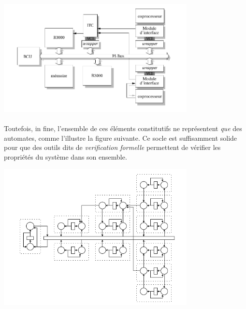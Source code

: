 \begin{center}
\begin{minipage}[t]{10cm}
 \centering
 \includegraphics[width=10cm]{./figures/system_1.png}
 \label{sys1}
\end{minipage}
\end{center}

\paragraph{} Toutefois, in fine, l'ensemble de ces éléments constitutifs ne représentent {\it que} des automates, comme l'illustre la figure suivante.
Ce socle est suffisamment solide pour que des outils dits de {\it verification formelle} permettent de vérifier les propriétés du système dans son ensemble.

\begin{center}
\begin{minipage}[t]{10cm}
 \centering
 \includegraphics[width=10cm]{./figures/system_2.png}
\end{minipage}
\end{center}

